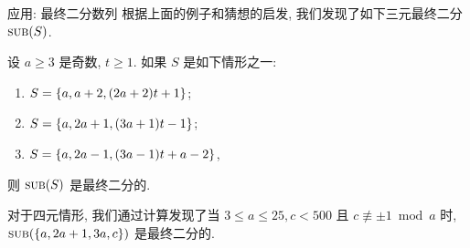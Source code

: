 \documentclass[aspectratio=169,handout]{ctexbeamer}
\DeclareMathOperator*{\SUB}{{\text{{\upshape\textsc{sub}}}}}
\begin{document}
\begin{frame}{应用: 最终二分数列}
	\onslide<+->
	根据上面的例子和猜想的启发, 我们发现了如下三元最终二分 $\SUB(S)$.
	\onslide<+->
	\begin{theorem}
		设 $a\ge 3$ 是奇数, $t\ge 1$.
		如果 $S$ 是如下情形之一:
		\begin{enumerate}
			\item $S={\left\{a,a+2,(2a+2)t+1\right\}}$;
			\item $S={\left\{a,2a+1,(3a+1)t-1\right\}}$;
			\item $S={\left\{a,2a-1,(3a-1)t+a-2\right\}}$,
		\end{enumerate}
		则 $\SUB(S)$ 是最终二分的.
	\end{theorem}
	\onslide<+->
	对于四元情形, 我们通过计算发现了当 $3\le a\le 25, c<500$ 且 $c\not\equiv \pm1 \bmod a$ 时, $\SUB(\set{a,2a+1,3a,c})$ 是最终二分的.
\end{frame}



\framethanks
\end{document}
